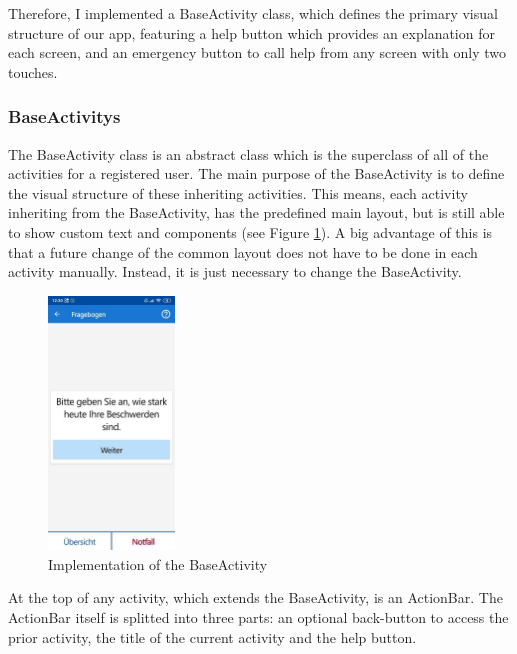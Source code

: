 Therefore, I implemented a BaseActivity class, which defines the primary visual structure of our app, featuring a help button which provides an explanation for each screen, and an emergency button to call help from any screen with only two touches.

\subsubsection{BaseActivitys}
The BaseActivity class is an abstract class which is the superclass of all of the activities for a registered user. The main purpose of the BaseActivity is to define the visual structure of these inheriting activities. This means, each activity inheriting from the BaseActivity, has the predefined main layout, but is still able to show custom text and components (see Figure \ref{fig:baseactivity}). A big advantage of this is that a future change of the common layout does not have to be done in each activity manually. Instead, it is just necessary to change the BaseActivity.

\begin{figure}
\vspace{-10pt}
  \begin{center}
    \includegraphics[width=0.30\textwidth]{figures/KlausBasicActivity.jpg}
  \end{center}
  \caption{Implementation of the BaseActivity}
  \label{fig:baseactivity}
  \vspace{-30pt}
\end{figure}
At the top of any activity, which extends the BaseActivity, is an ActionBar. The ActionBar itself is splitted into three parts: an optional back-button to access the prior activity, the title of the current activity and the help button.

